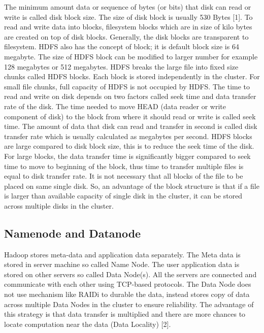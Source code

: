 The minimum amount data or sequence of bytes (or bits) that disk can read or write is called disk block size. The size of disk block is usually 530 Bytes [1]. To read and write data into blocks, filesystem blocks which are in size of kilo bytes are created on top of disk blocks. Generally, the disk blocks are transparent to filesystem. 
HDFS also has the concept of block; it is default block size is 64 megabyte. The size of HDFS block can be modified to larger number for example 128 megabytes or 512 megabytes. HDFS breaks the large file into fixed size chunks called HDFS blocks. Each block is stored independently in the cluster. For small file chunks, full capacity of HDFS is not occupied by HDFS. 
The time to read and write on disk depends on two factors called seek time and data transfer rate of the disk. The time needed to move HEAD (data reader or write component of disk) to the block from where it should read or write is called seek time. The amount of data that disk can read and transfer in second is called disk transfer rate which is usually calculated as megabytes per second. HDFS blocks are large compared to disk block size, this is to reduce the seek time of the disk. For large blocks, the data transfer time is significantly bigger compared to seek time to move to beginning of the block, thus time to transfer multiple files is equal to disk transfer rate.
It is not necessary that all blocks of the file to be placed on same single disk.  So, an advantage of the block structure is that if a file is larger than available capacity of single disk in the cluster, it can be stored across multiple disks in the cluster. 



\subsection{Namenode and Datanode}

Hadoop stores meta-data and application data separately. The Meta data is stored in server machine so called Name Node. The user application data is stored on other servers so called Data Node(s). All the servers are connected and communicate with each other using TCP-based protocols. The Data Node does not use mechanism like RAIDi to durable the data, instead stores copy of data across multiple Data Nodes in the cluster to ensure reliability. The advantage of this strategy is that data transfer is multiplied and there are more chances to locate computation near the data (Data Locality) [2].

